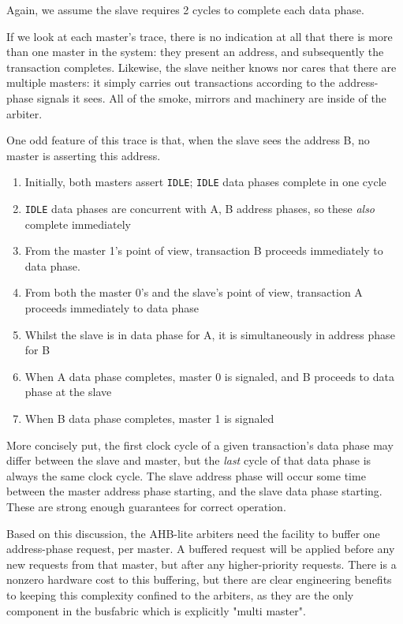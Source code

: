 \documentclass{article}
\begin{document}
Again, we assume the slave requires 2 cycles to complete each data phase.

If we look at each master's trace, there is no indication at all that there is more than one master in the system: they present an address, and subsequently the transaction completes. Likewise, the slave neither knows nor cares that there are multiple masters: it simply carries out transactions according to the address-phase signals it sees. All of the smoke, mirrors and machinery are inside of the arbiter.

One odd feature of this trace is that, when the slave sees the address B, no master is asserting this address.

\begin{enumerate}
	\item Initially, both masters assert \texttt{IDLE}; \texttt{IDLE} data phases complete in one cycle
	\item \texttt{IDLE} data phases are concurrent with A, B address phases, so these \textit{also} complete immediately
	\item From the master 1's point of view, transaction B proceeds immediately to data phase.
	\item From both the master 0's and the slave's point of view, transaction A proceeds immediately to data phase
	\item Whilst the slave is in data phase for A, it is simultaneously in address phase for B
	\item When A data phase completes, master 0 is signaled, and B proceeds to data phase at the slave
	\item When B data phase completes, master 1 is signaled
\end{enumerate}

More concisely put, the first clock cycle of a given transaction's data phase may differ between the slave and master, but the \textit{last} cycle of that data phase is always the same clock cycle. The slave address phase will occur some time between the master address phase starting, and the slave data phase starting. These are strong enough guarantees for correct operation.

Based on this discussion, the AHB-lite arbiters need the facility to buffer one address-phase request, per master. A buffered request will be applied before any new requests from that master, but after any higher-priority requests. There is a nonzero hardware cost to this buffering, but there are clear engineering benefits to keeping this complexity confined to the arbiters, as they are the only component in the busfabric which is explicitly "multi master".
\end{document}
